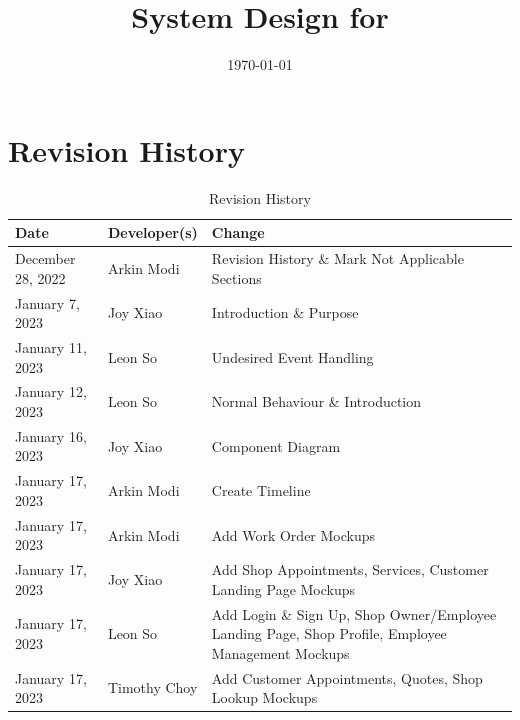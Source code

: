\documentclass[12pt, titlepage]{article}
\begin{document}
\title{System Design for \progname{}}
\author{\authname}
\date{\today}

\maketitle


\section{Revision History}

\begin{table}[hp]
	\caption{Revision History} \label{TblRevisionHistory}
	\begin{tabularx}{\textwidth}{llX}
		\toprule
		\textbf{Date}     & \textbf{Developer(s)} & \textbf{Change}                                                                                   \\
		\midrule
		December 28, 2022 & Arkin Modi            & Revision History \& Mark Not Applicable Sections                                                  \\
		January 7, 2023   & Joy Xiao              & Introduction \& Purpose                                                                           \\
		January 11, 2023  & Leon So               & Undesired Event Handling                                                                          \\
		January 12, 2023  & Leon So               & Normal Behaviour \& Introduction                                                                  \\
		January 16, 2023  & Joy Xiao              & Component Diagram                                                                                 \\
		January 17, 2023  & Arkin Modi            & Create Timeline                                                                                   \\
		January 17, 2023  & Arkin Modi            & Add Work Order Mockups                                                                            \\
		January 17, 2023  & Joy Xiao              & Add Shop Appointments, Services, Customer Landing Page Mockups                                    \\
		January 17, 2023  & Leon So               & Add Login \& Sign Up, Shop Owner/Employee Landing Page, Shop Profile, Employee Management Mockups \\
		January 17, 2023  & Timothy Choy          & Add Customer Appointments, Quotes, Shop Lookup Mockups                                            \\
		\bottomrule
	\end{tabularx}
\end{table}
\end{document}
